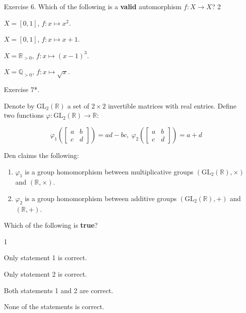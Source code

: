 \documentclass[../../book.tex]{subfiles}
\begin{document}
\begin{xexercise}
    {Exercise 6.}
    {Which of the following is a \textbf{valid} automorphism $f: X \to X$?}
    {2}
    {
        \item $X = [0,1]$, $f: x \mapsto x^2$.
        \item $X = [0,1]$, $f: x \mapsto x + 1$.
        \item $X = \mathbb{R}_{>0}$, $f: x \mapsto (x-1)^3$.
        \item $X = \mathbb{Q}_{>0}$, $f: x \mapsto \sqrt{x}$.
    }
\end{xexercise}

\begin{xexercise}
    {Exercise 7*.}
    {
        Denote by $\text{GL}_2(\mathbb{R})$ a set of $2\times 2$ invertible matrices with real entries. Define 
        two functions $\varphi: \text{GL}_2(\mathbb{R}) \to \mathbb{R}$:
        
        \begin{equation*}
            \varphi_1 \left(\begin{bmatrix}
                a & b \\ c & d
            \end{bmatrix}\right) = ad - bc, \; \varphi_2 \left(\begin{bmatrix}
                a & b \\ c & d
            \end{bmatrix}\right) = a + d
        \end{equation*}
        
        Den claims the following:
        \begin{enumerate}
            \item $\varphi_1$ is a group homomorphism between multiplicative groups $(\text{GL}_2(\mathbb{R}), \times)$ and $(\mathbb{R}, \times)$.
            \item $\varphi_2$ is a group homomorphism between additive groups $(\text{GL}_2(\mathbb{R}), +)$ and $(\mathbb{R}, +)$.
        \end{enumerate}
        
        Which of the following is \textbf{true}?
    }
    {1}
    {
        \item Only statement 1 is correct.
        \item Only statement 2 is correct.
        \item Both statements 1 and 2 are correct.
        \item None of the statements is correct.
    }
\end{xexercise}
\end{document}
